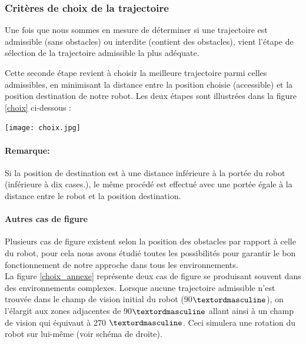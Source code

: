 \subsubsection{Critères de choix de la trajectoire}
Une fois que nous sommes en mesure de déterminer si une trajectoire est admissible (sans obstacles) ou interdite (contient des obstacles), vient l'étape de sélection de la trajectoire admissible la plus adéquate.

Cette seconde étape revient à choisir la meilleure trajectoire parmi celles admissibles, en minimisant la distance entre la position choisie (accessible) et la position destination de notre robot.
Les deux étapes sont illustrées dans la figure \ref{choix} ci-dessous :

\begin{center}	  
	\texttt{[image: choix.jpg]}%
	\vspace{-0.1 cm}
	\label{choix}%
\end{center}

\paragraph{Remarque:} Si la position de destination est à une distance inférieure à la portée du robot (inférieure à dix cases.), le même procédé est effectué avec une portée égale à la distance entre le robot et la position destination.

\paragraph{Autres cas de figure}

Plusieurs cas de figure existent selon la position des obstacles par rapport à celle du robot, pour cela nous avons étudié toutes les possibilités pour garantir le bon fonctionnement de notre approche dans tous les environnements.\\

La figure \ref{choix_annexe} représente deux cas de figure se produisant souvent dans des environnements complexes.
Lorsque aucune trajectoire admissible n'est trouvée dans le champ de vision initial du robot (90$\textordmasculine$), on l'élargit aux zones adjacentes de 90$\textordmasculine$ allant ainsi à un champ de vision qui équivaut à 270 $\textordmasculine$. Ceci simulera une rotation du robot sur lui-même (voir schéma de droite).


